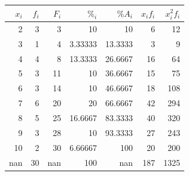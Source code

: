 \documentclass[addpoints,spanish, 12pt,a4paper]{exam}
\begin{document}
\begin{questions}
\begin{parts}
\begin{solution}
\begin{tabular}{rrrrrrr}
\hline
   $x_i$ &   $f_i$ &   $F_i$ &    $\%_i$ &   $\%A_i$ &   $x_if_i$ &   $x^2_if_i$ \\
\hline
       2 &       3 &       3 &  10       &   10      &          6 &           12 \\
       3 &       1 &       4 &   3.33333 &   13.3333 &          3 &            9 \\
       4 &       4 &       8 &  13.3333  &   26.6667 &         16 &           64 \\
       5 &       3 &      11 &  10       &   36.6667 &         15 &           75 \\
       6 &       3 &      14 &  10       &   46.6667 &         18 &          108 \\
       7 &       6 &      20 &  20       &   66.6667 &         42 &          294 \\
       8 &       5 &      25 &  16.6667  &   83.3333 &         40 &          320 \\
       9 &       3 &      28 &  10       &   93.3333 &         27 &          243 \\
      10 &       2 &      30 &   6.66667 &  100      &         20 &          200 \\
     nan &      30 &     nan & 100       &  nan      &        187 &         1325 \\
\hline

\end{tabular}
\end{solution}
\end{parts}
\end{questions}
\end{document}
